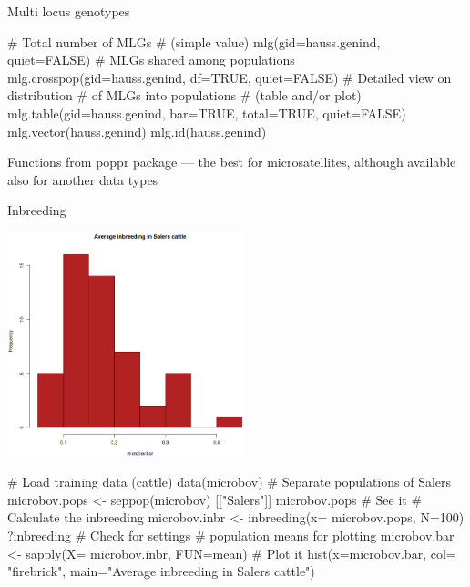 \documentclass[compress, xelatex, 11pt, xcolor=svgnames, aspectratio=169,
	hyperref={
		bookmarks=true,
		unicode=true,
		colorlinks=true,
		pdftitle={Molecular data in R},
		plainpages=false,
		pdfauthor={Vojtech Zeisek},
		pdfsubject={Course about phylogeny and evolution in R},
		pdfcreator={XeLaTeX},
		pdfkeywords={R, evolution, phylogeny, molecular data},
		linkcolor=Crimson, %
		anchorcolor=Magenta, %
		citecolor=Magenta, %
		filecolor=Magenta, %
		menucolor=Magenta, %
		urlcolor=DodgerBlue, %
		},
	url={hyphens, lowtilde} %
	]{beamer}
\renewcommand{\texttt}[1]{\colorbox{Beige}{{\ttfamily #1}}}
\begin{document}
\begin{frame}[fragile]{Multi locus genotypes}
	\begin{multicols}{2}
		\texttt{[image: mlg.png]}
		\begin{spluscode}
    # Total number of MLGs
    # (simple value)
    mlg(gid=hauss.genind, quiet=FALSE)
    # MLGs shared among populations
    mlg.crosspop(gid=hauss.genind,
      df=TRUE, quiet=FALSE)
    # Detailed view on distribution
    # of MLGs into populations
    # (table and/or plot)
    mlg.table(gid=hauss.genind,
      bar=TRUE, total=TRUE,
      quiet=FALSE)
    mlg.vector(hauss.genind)
    mlg.id(hauss.genind)
		\end{spluscode}
	\end{multicols}
	Functions from poppr package --- the best for microsatellites, although available also for another data types
\end{frame}

\begin{frame}[fragile]{Inbreeding}
	\begin{multicols}{2}
		\includegraphics[height=6.5cm]{inbreeding.png}
		\begin{spluscode}
    # Load training data (cattle)
    data(microbov)
    # Separate populations of Salers
    microbov.pops <- seppop(microbov)
      [["Salers"]]
    microbov.pops # See it
    # Calculate the inbreeding
    microbov.inbr <- inbreeding(x=
      microbov.pops, N=100)
    ?inbreeding # Check for settings
    # population means for plotting
    microbov.bar <- sapply(X=
      microbov.inbr, FUN=mean)
    # Plot it
    hist(x=microbov.bar, col=
      "firebrick", main="Average
      inbreeding in Salers cattle")
		\end{spluscode}
	\end{multicols}
\end{frame}

\end{document}
